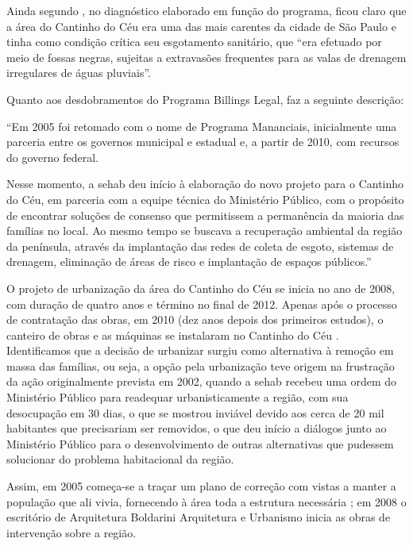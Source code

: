 	Ainda segundo , no diagnóstico elaborado em função do programa, ficou claro que a área do Cantinho do Céu era uma das mais carentes da cidade de São Paulo e tinha como condição crítica seu esgotamento sanitário, que ``era efetuado por meio de fossas negras, sujeitas a extravasões frequentes para as valas de drenagem irregulares de águas pluviais''.
	
	Quanto aos desdobramentos do Programa Billings Legal,  faz a seguinte descrição:
	
	\begin{citacao}
		``Em 2005 foi retomado com o nome de Programa Mananciais, inicialmente uma parceria entre os governos municipal e estadual e, a partir de 2010, com recursos do governo federal.
		
		Nesse momento, a \gls{sehab} deu início à elaboração do novo projeto para o Cantinho do Céu, em parceria com a equipe técnica do Ministério Público, com o propósito de encontrar soluções de consenso que permitissem a permanência da maioria das famílias no local. Ao mesmo tempo se buscava a recuperação ambiental da região da península, através da implantação das redes de coleta de esgoto, sistemas de drenagem, eliminação de áreas de risco e implantação de espaços públicos.''
	\end{citacao}
	
	O projeto de urbanização da área do Cantinho do Céu se inicia no ano de 2008, com duração de quatro anos e término no final de 2012. Apenas após o processo de contratação das obras, em 2010 (dez anos depois dos primeiros estudos), o canteiro de obras e as máquinas se instalaram no Cantinho do Céu \cite{Barda2012}. Identificamos que a decisão de urbanizar surgiu como alternativa à remoção em massa das famílias, ou seja, a opção pela urbanização teve origem na frustração da ação originalmente prevista em 2002, quando a \gls{sehab} recebeu uma ordem do Ministério Público para readequar urbanisticamente a região, com sua desocupação em 30 dias, o que se mostrou inviável devido aos cerca de 20 mil habitantes que precisariam ser removidos, o que deu início a diálogos junto ao Ministério Público para o desenvolvimento de outras alternativas que pudessem solucionar do problema habitacional da região. \cite[p.21]{Barda2012}
	
	Assim, em 2005 começa-se a traçar um plano de correção com vistas a manter a população que ali vivia, fornecendo à área toda a estrutura necessária \cite{Barda2012}; em 2008 o escritório de Arquitetura  Boldarini Arquitetura e Urbanismo inicia as obras de intervenção sobre a região.

